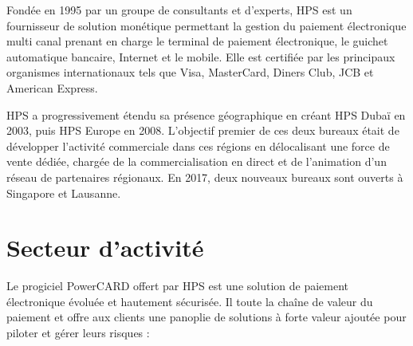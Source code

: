 Fondée en 1995 par un groupe de consultants et d'experts, HPS est un fournisseur de solution monétique permettant la gestion du paiement électronique multi canal prenant en charge le terminal de paiement électronique, le guichet automatique bancaire, Internet et le mobile. Elle est certifiée par les principaux organismes internationaux tels que Visa, MasterCard, Diners Club, JCB et American Express.

HPS a progressivement étendu sa présence géographique en créant HPS Dubaï en 2003, puis HPS Europe en 2008. L'objectif premier de ces deux bureaux était de développer l'activité commerciale dans ces régions en délocalisant une force de vente dédiée, chargée de la commercialisation en direct et de l'animation d'un réseau de partenaires régionaux. En 2017, deux nouveaux bureaux sont ouverts à Singapore et Lausanne.

\section{Secteur d'activité}

Le progiciel PowerCARD offert par HPS est une solution de paiement électronique évoluée et hautement sécurisée. Il toute la chaîne de valeur du paiement et offre aux clients une panoplie de solutions à forte valeur ajoutée pour piloter et gérer leurs risques :

